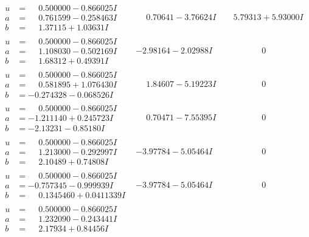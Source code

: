 \documentclass[1p]{elsarticle_modified}
\theoremstyle{definition}
\begin{document}
$$\begin{array}{c|c|c}
\begin{aligned}
u &= \phantom{-}0.500000 - 0.866025 I \\
a &= \phantom{-}0.761599 - 0.258463 I \\
b &= \phantom{-}1.37115 + 1.03631 I\end{aligned}
 & \phantom{-}0.70641 - 3.76624 I & \phantom{-}5.79313 + 5.93000 I \\ \hline\begin{aligned}
u &= \phantom{-}0.500000 - 0.866025 I \\
a &= \phantom{-}1.108030 - 0.502169 I \\
b &= \phantom{-}1.68312 + 0.49391 I\end{aligned}
 & -2.98164 - 2.02988 I & \phantom{-0.000000 } 0 \\ \hline\begin{aligned}
u &= \phantom{-}0.500000 - 0.866025 I \\
a &= \phantom{-}0.581895 + 1.076430 I \\
b &= -0.274328 - 0.068526 I\end{aligned}
 & \phantom{-}1.84607 - 5.19223 I & \phantom{-0.000000 } 0 \\ \hline\begin{aligned}
u &= \phantom{-}0.500000 - 0.866025 I \\
a &= -1.211140 + 0.245723 I \\
b &= -2.13231 - 0.85180 I\end{aligned}
 & \phantom{-}0.70471 - 7.55395 I & \phantom{-0.000000 } 0 \\ \hline\begin{aligned}
u &= \phantom{-}0.500000 - 0.866025 I \\
a &= \phantom{-}1.213000 - 0.292997 I \\
b &= \phantom{-}2.10489 + 0.74808 I\end{aligned}
 & -3.97784 - 5.05464 I & \phantom{-0.000000 } 0 \\ \hline\begin{aligned}
u &= \phantom{-}0.500000 - 0.866025 I \\
a &= -0.757345 - 0.999939 I \\
b &= \phantom{-}0.1345460 + 0.0411339 I\end{aligned}
 & -3.97784 - 5.05464 I & \phantom{-0.000000 } 0 \\ \hline\begin{aligned}
u &= \phantom{-}0.500000 - 0.866025 I \\
a &= \phantom{-}1.232090 - 0.243441 I \\
b &= \phantom{-}2.17934 + 0.84456 I\end{aligned}

\end{array}$$
\end{document}
